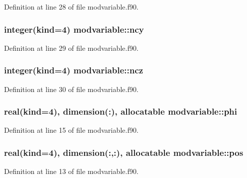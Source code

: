Definition at line 28 of file modvariable.\+f90.

\subsubsection[{\texorpdfstring{ncy}{ncy}}]{\setlength{\rightskip}{0pt plus 5cm}integer(kind=4) modvariable\+::ncy}\hypertarget{namespacemodvariable_ac9a317ff189f6a3f0bac9df49e622027}{}\label{namespacemodvariable_ac9a317ff189f6a3f0bac9df49e622027}


Definition at line 29 of file modvariable.\+f90.

\subsubsection[{\texorpdfstring{ncz}{ncz}}]{\setlength{\rightskip}{0pt plus 5cm}integer(kind=4) modvariable\+::ncz}\hypertarget{namespacemodvariable_ad8d90278c9709b9db15059e8c320feb4}{}\label{namespacemodvariable_ad8d90278c9709b9db15059e8c320feb4}


Definition at line 30 of file modvariable.\+f90.

\subsubsection[{\texorpdfstring{phi}{phi}}]{\setlength{\rightskip}{0pt plus 5cm}real(kind=4), dimension(\+:), allocatable modvariable\+::phi}\hypertarget{namespacemodvariable_a00db7c06432451702db34fda71ed1cd1}{}\label{namespacemodvariable_a00db7c06432451702db34fda71ed1cd1}


Definition at line 15 of file modvariable.\+f90.

\subsubsection[{\texorpdfstring{pos}{pos}}]{\setlength{\rightskip}{0pt plus 5cm}real(kind=4), dimension(\+:,\+:), allocatable modvariable\+::pos}\hypertarget{namespacemodvariable_a280e598b1db785bf34f0165ecd7b6985}{}\label{namespacemodvariable_a280e598b1db785bf34f0165ecd7b6985}


Definition at line 13 of file modvariable.\+f90.

